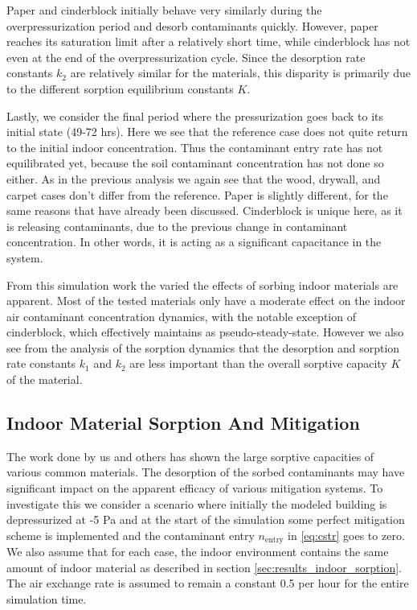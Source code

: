 Paper and cinderblock initially behave very similarly during the overpressurization period and desorb contaminants quickly.
However, paper reaches its saturation limit after a relatively short time, while cinderblock has not even at the end of the overpressurization cycle.
Since the desorption rate constants $k_2$ are relatively similar for the materials, this disparity is primarily due to the different sorption equilibrium constants $K$.\par

Lastly, we consider the final period where the pressurization goes back to its initial state (49-72 hrs).
Here we see that the reference case does not quite return to the initial indoor concentration.
Thus the contaminant entry rate has not equilibrated yet, because the soil contaminant concentration has not done so either.
As in the previous analysis we again see that the wood, drywall, and carpet cases don't differ from the reference.
Paper is slightly different, for the same reasons that have already been discussed.
Cinderblock is unique here, as it is releasing contaminants, due to the previous change in contaminant concentration.
In other words, it is acting as a significant capacitance in the system.\par

From this simulation work the varied the effects of sorbing indoor materials are apparent.
Most of the tested materials only have a moderate effect on the indoor air contaminant concentration dynamics, with the notable exception of cinderblock, which effectively maintains as pseudo-steady-state.
However we also see from the analysis of the sorption dynamics that the desorption and sorption rate constants $k_1$ and $k_2$ are less important than the overall sorptive capacity $K$ of the material.\par

\subsection{Indoor Material Sorption And Mitigation}\label{sec:results_indoor_mitigation}

The work done by us and others has shown the large sorptive capacities of various common materials.
The desorption of the sorbed contaminants may have significant impact on the apparent efficacy of various mitigation systems.
To investigate this we consider a scenario where initially the modeled building is depressurized at -5 Pa and at the start of the simulation some perfect mitigation scheme is implemented and the contaminant entry $n_\mathrm{entry}$ in \eqref{eq:cstr} goes to zero.
We also assume that for each case, the indoor environment contains the same amount of indoor material as described in section \ref{sec:results_indoor_sorption}.
The air exchange rate is assumed to remain a constant 0.5 per hour for the entire simulation time.\par

